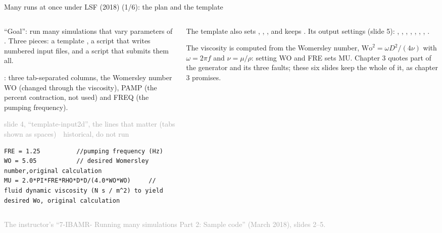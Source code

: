 \documentclass[aspectratio=169,11pt]{beamer}
\newcommand{\sourcecredit}[1]{\vfill\begin{flushright}\tiny\textcolor{DarkGray}{#1}\end{flushright}}
\newcommand{\hist}[1]{{\tiny\sffamily\textcolor{DarkGray}{#1\ \textbullet\ historical, do not run}}\par\nointerlineskip\vspace{0.3mm}}
\begin{document}
\begin{frame}[fragile]{Many runs at once under LSF (2018) (1/6): the plan and the template}
\label{fr:sweep1}
\begin{columns}[T,onlytextwidth]
\begin{column}{0.5\textwidth}
\footnotesize ``Goal'': run many simulations that vary parameters of . Three pieces: a template , a script  that writes numbered input files, and a script that submits them all.

\vspace{1mm}
: three tab-separated columns, the Womersley number WO (changed through the viscosity), PAMP (the percent contraction, not used) and FREQ (the pumping frequency).
\par\vspace{1mm}
\hist{slide 4, ``template-input2d'', the lines that matter (tabs shown as spaces)}
\begin{lstlisting}[style=hist]
FRE = 1.25          //pumping frequency (Hz)
WO = 5.05           // desired Womersley number,original calculation
MU = 2.0*PI*FRE*RHO*D*D/(4.0*WO*WO)     // fluid dynamic viscosity (N s / m^2) to yield desired Wo, original calculation
\end{lstlisting}
\end{column}
\begin{column}{0.47\textwidth}
\scriptsize The template also sets , , ,  and keeps . Its output settings (slide 5): , , , , , , , .

\vspace{2mm}
\footnotesize The viscosity is computed from the Womersley number, $\mathrm{Wo}^2 = \omega D^2/(4\nu)$ with $\omega = 2\pi f$ and $\nu = \mu/\rho$: setting WO and FRE sets MU. Chapter 3 quotes part of the generator and its three faults; these six slides keep the whole of it, as chapter 3 promises.
\end{column}
\end{columns}
\sourcecredit{The instructor's ``7-IBAMR- Running many simulations Part 2: Sample code'' (March 2018), slides 2--5.}
\end{frame}
\end{document}
